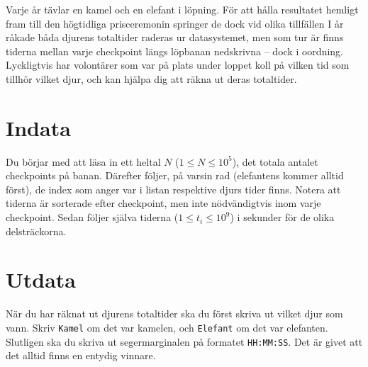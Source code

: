 Varje år tävlar en kamel och en elefant i löpning.
För att hålla resultatet hemligt fram till den högtidliga prisceremonin springer de dock vid olika tillfällen
I år råkade båda djurens totaltider raderas ur datasystemet, men som tur är finns tiderna mellan varje checkpoint längs löpbanan nedskrivna – dock i oordning.
Lyckligtvis har volontärer som var på plats under loppet koll på vilken tid som tillhör vilket djur, och kan hjälpa dig att räkna ut deras totaltider.

\section*{Indata}
Du börjar med att läsa in ett heltal $N$ ($1 \leq N \leq 10^5$), det totala antalet checkpoints på banan.
Därefter följer, på varsin rad (elefantens kommer alltid först), de index som anger var i listan respektive djurs tider finns.
Notera att tiderna är sorterade efter checkpoint, men inte nödvändigtvis inom varje checkpoint.
Sedan följer själva tiderna ($1 \leq t_i \leq 10^9$) i sekunder för de olika delsträckorna.

\section*{Utdata}
När du har räknat ut djurens totaltider ska du först skriva ut vilket djur som vann.
Skriv \verb|Kamel| om det var kamelen, och \verb|Elefant| om det var elefanten.
Slutligen ska du skriva ut segermarginalen på formatet \verb|HH:MM:SS|.
Det är givet att det alltid finns en entydig vinnare.